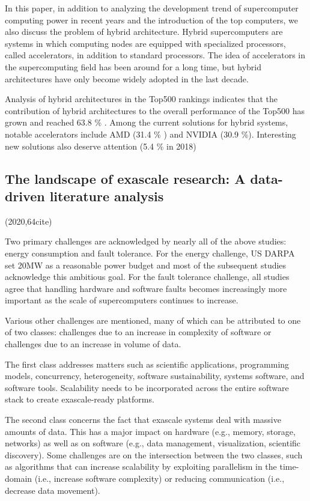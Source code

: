\documentclass[a4paper,twoside]{scrbook}
\begin{document}
In this paper, in addition to analyzing the development trend of supercomputer computing power in recent years and the introduction of the top computers, we also discuss the problem of hybrid architecture.
Hybrid supercomputers are systems in which computing nodes are equipped with specialized processors, called accelerators, in addition to standard processors. The idea of accelerators in the supercomputing field has been around for a long time, but hybrid architectures have only become widely adopted in the last decade. 

Analysis of hybrid architectures in the Top500 rankings indicates that the contribution of hybrid architectures to the overall performance of the Top500 has grown and reached 63.8 \% . Among the current solutions for hybrid systems, notable accelerators include AMD (31.4 \% ) and NVIDIA (30.9 \%). Interesting new solutions also deserve attention (5.4 \%  in 2018) 


\subsection{The landscape of exascale research: A data-driven literature analysis\cite{heldens2020landscape}}
(2020,64cite)\par

Two primary challenges are acknowledged by nearly all of the above studies: energy consumption and fault tolerance. For the energy challenge, US DARPA set 20MW as a reasonable power budget and most of the subsequent studies acknowledge this ambitious goal. For the fault tolerance challenge, all studies agree that handling hardware and software faults becomes increasingly more important as the scale of supercomputers continues to increase.

Various other challenges are mentioned, many of which can be attributed to one of two classes: challenges due to an increase in complexity of software or challenges due to an increase in volume of data. 

The first class addresses matters such as scientific applications, programming models, concurrency, heterogeneity, software sustainability, systems software, and software tools. Scalability needs to be incorporated across the entire software stack to create exascale-ready platforms. 

The second class concerns the fact that exascale systems deal with massive amounts of data. This has a major impact on hardware (e.g., memory, storage, networks) as well as on software (e.g., data management, visualization, scientific discovery). Some challenges are on the intersection between the two classes, such as algorithms that can increase scalability by exploiting parallelism in the time-domain (i.e., increase software complexity) or reducing communication (i.e., decrease data movement).
\end{document}
